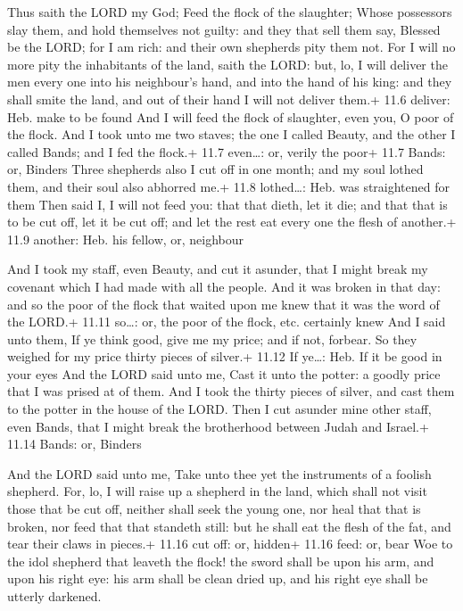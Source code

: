  Thus saith the LORD my God; Feed the flock of the
slaughter;  Whose possessors slay them, and hold themselves
not guilty: and they that sell them say, Blessed be the LORD; for I am
rich: and their own shepherds pity them not.  For I will no
more pity the inhabitants of the land, saith the LORD: but, lo, I will
deliver the men every one into his neighbour's hand, and into the hand
of his king: and they shall smite the land, and out of their hand I will
not deliver them.+ 11.6 deliver: Heb. make to be found  And
I will feed the flock of slaughter, even you, O poor of the flock. And I
took unto me two staves; the one I called Beauty, and the other I called
Bands; and I fed the flock.+ 11.7 even\ldots: or, verily the poor+ 11.7
Bands: or, Binders  Three shepherds also I cut off in one
month; and my soul lothed them, and their soul also abhorred me.+ 11.8
lothed\ldots: Heb. was straightened for them  Then said I, I
will not feed you: that that dieth, let it die; and that that is to be
cut off, let it be cut off; and let the rest eat every one the flesh of
another.+ 11.9 another: Heb. his fellow, or, neighbour

 And I took my staff, even Beauty, and cut it asunder,
that I might break my covenant which I had made with all the people.
 And it was broken in that day: and so the poor of the
flock that waited upon me knew that it was the word of the LORD.+ 11.11
so\ldots: or, the poor of the flock, etc. certainly knew 
And I said unto them, If ye think good, give me my price; and if not,
forbear. So they weighed for my price thirty pieces of silver.+ 11.12 If
ye\ldots: Heb. If it be good in your eyes  And the LORD
said unto me, Cast it unto the potter: a goodly price that I was prised
at of them. And I took the thirty pieces of silver, and cast them to the
potter in the house of the LORD.  Then I cut asunder mine
other staff, even Bands, that I might break the brotherhood between
Judah and Israel.+ 11.14 Bands: or, Binders

 And the LORD said unto me, Take unto thee yet the
instruments of a foolish shepherd.  For, lo, I will raise
up a shepherd in the land, which shall not visit those that be cut off,
neither shall seek the young one, nor heal that that is broken, nor feed
that that standeth still: but he shall eat the flesh of the fat, and
tear their claws in pieces.+ 11.16 cut off: or, hidden+ 11.16 feed: or,
bear  Woe to the idol shepherd that leaveth the flock! the
sword shall be upon his arm, and upon his right eye: his arm shall be
clean dried up, and his right eye shall be utterly darkened.

